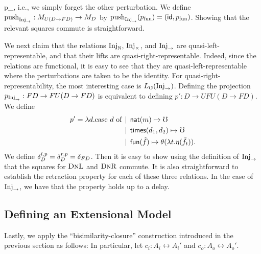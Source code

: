 p_{}, \)
%
i.e., we simply forget the other perturbation.
%
We define $\text{push}_{\text{Inj}_\to} : M_{U(D \to FD)} \to M_D$ by \( \text{push}_{\text{Inj}_\to}(p_{\text{fun}}) = (\mathsf{id}, p_{\text{fun}}) \).
%
Showing that the relevant squares commute is straightforward.
%


We next claim that the relations $\text{Inj}_\mathbb{N}$, $\text{Inj}_\times$, and $\text{Inj}_\to$ are
quasi-left-representable, and that their lifts are quasi-right-representable.
Indeed, since the relations are functional, it is easy to see that they are
quasi-left-representable where the perturbations are taken to be the identity.
%
For quasi-right-representability, the most interesting case is $L_\mho(\text{Inj}_\to)$.
Defining the projection $p_{\text{Inj}_\to} : FD \to FU(D \to FD)$ is equivalent to
defining $p' : D \to UFU(D \to FD)$. We define
\begin{align*}
 p' = \lambda d.\text{case $d$ of}   &\mathrel{\bf \,\mid\,} \mathsf{nat}(m) \mapsto \mho \\
    &\mathrel{\bf \,\mid\,} \mathsf{times}(d_1, d_2) \mapsto \mho \\
    &\mathrel{\bf \,\mid\,} \mathsf{fun}(\tilde{f}) \mapsto \theta (\lambda t. \eta(\tilde{f}_t)).
\end{align*}
%
We define $\delta^{l,p}_D = \delta^{r,p}_D = \delta_{FD}$. Then it is easy to show using the
definition of $\text{Inj}_\to$ that the squares for $\textsc{DnL}$ and $\textsc{DnR}$ commute.
%
It is also straightforward to establish the retraction property for each of
these three relations. In the case of $\text{Inj}_\to$, we have that the property holds
up to a delay.


\subsection{Defining an Extensional Model}

Lastly, we apply the ``bisimilarity-closure'' construction introduced in the
previous section as follows: In particular, let $c_i : A_i \rel A_i'$ and $c_o :
A_o \rel A_o'$.
%

